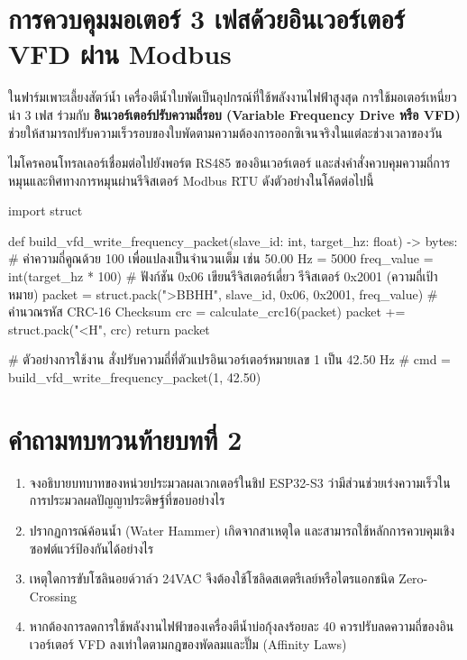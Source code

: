 \section{การควบคุมมอเตอร์ 3 เฟสด้วยอินเวอร์เตอร์ VFD ผ่าน Modbus}

ในฟาร์มเพาะเลี้ยงสัตว์น้ำ เครื่องตีน้ำใบพัดเป็นอุปกรณ์ที่ใช้พลังงานไฟฟ้าสูงสุด การใช้มอเตอร์เหนี่ยวนำ 3 เฟส ร่วมกับ \textbf{อินเวอร์เตอร์ปรับความถี่รอบ (Variable Frequency Drive หรือ VFD)} ช่วยให้สามารถปรับความเร็วรอบของใบพัดตามความต้องการออกซิเจนจริงในแต่ละช่วงเวลาของวัน

ไมโครคอนโทรลเลอร์เชื่อมต่อไปยังพอร์ต RS485 ของอินเวอร์เตอร์ และส่งคำสั่งควบคุมความถี่การหมุนและทิศทางการหมุนผ่านรีจิสเตอร์ Modbus RTU ดังตัวอย่างในโค้ดต่อไปนี้

\begin{pythonbox}
import struct

def build_vfd_write_frequency_packet(slave_id: int, target_hz: float) -> bytes:
    # ค่าความถี่คูณด้วย 100 เพื่อแปลงเป็นจำนวนเต็ม เช่น 50.00 Hz = 5000
    freq_value = int(target_hz * 100)
    # ฟังก์ชัน 0x06 เขียนรีจิสเตอร์เดี่ยว รีจิสเตอร์ 0x2001 (ความถี่เป้าหมาย)
    packet = struct.pack(">BBHH", slave_id, 0x06, 0x2001, freq_value)
    # คำนวณรหัส CRC-16 Checksum
    crc = calculate_crc16(packet)
    packet += struct.pack("<H", crc)
    return packet

# ตัวอย่างการใช้งาน สั่งปรับความถี่ที่ตัวแปรอินเวอร์เตอร์หมายเลข 1 เป็น 42.50 Hz
# cmd = build_vfd_write_frequency_packet(1, 42.50)
\end{pythonbox}

\section*{คำถามทบทวนท้ายบทที่ 2}

\begin{enumerate}
    \item จงอธิบายบทบาทของหน่วยประมวลผลเวกเตอร์ในชิป ESP32-S3 ว่ามีส่วนช่วยเร่งความเร็วในการประมวลผลปัญญาประดิษฐ์ที่ขอบอย่างไร
    \item ปรากฏการณ์ค้อนน้ำ (Water Hammer) เกิดจากสาเหตุใด และสามารถใช้หลักการควบคุมเชิงซอฟต์แวร์ป้องกันได้อย่างไร
    \item เหตุใดการขับโซลินอยด์วาล์ว 24VAC จึงต้องใช้โซลิดสเตตรีเลย์หรือไตรแอกชนิด Zero-Crossing
    \item หากต้องการลดการใช้พลังงานไฟฟ้าของเครื่องตีน้ำบ่อกุ้งลงร้อยละ 40 ควรปรับลดความถี่ของอินเวอร์เตอร์ VFD ลงเท่าใดตามกฎของพัดลมและปั๊ม (Affinity Laws)
\end{enumerate}
\clearpage
